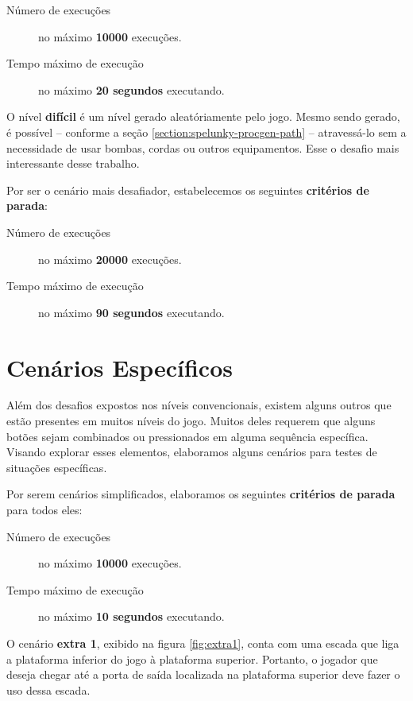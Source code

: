 \begin{description}
    \item [Número de execuções] no máximo \textbf{10000} execuções.
    \item [Tempo máximo de execução] no máximo \textbf{20 segundos} executando.
\end{description}

O nível \textbf{difícil} é um nível gerado aleatóriamente pelo jogo. Mesmo
sendo gerado, é possível -- conforme a seção
\ref{section:spelunky-procgen-path} -- atravessá-lo sem a necessidade de usar
bombas, cordas ou outros equipamentos. Esse o desafio mais interessante desse
trabalho.

Por ser o cenário mais desafiador, estabelecemos os seguintes \textbf{critérios
de parada}:

\begin{description}
    \item [Número de execuções] no máximo \textbf{20000} execuções.
    \item [Tempo máximo de execução] no máximo \textbf{90 segundos} executando.
\end{description}

\section{Cenários Específicos}

Além dos desafios expostos nos níveis convencionais, existem alguns outros que
estão presentes em muitos níveis do jogo. Muitos deles requerem que alguns
botões sejam combinados ou pressionados em alguma sequência específica. Visando
explorar esses elementos, elaboramos alguns cenários para testes de situações
específicas.

Por serem cenários simplificados, elaboramos os seguintes \textbf{critérios de
parada} para todos eles:

\begin{description}
    \item [Número de execuções] no máximo \textbf{10000} execuções.
    \item [Tempo máximo de execução] no máximo \textbf{10 segundos} executando.
\end{description}

O cenário \textbf{extra 1}, exibido na figura \ref{fig:extra1}, conta com uma
escada que liga a plataforma inferior do jogo à plataforma superior. Portanto,
o jogador que deseja chegar até a porta de saída localizada na plataforma
superior deve fazer o uso dessa escada.

